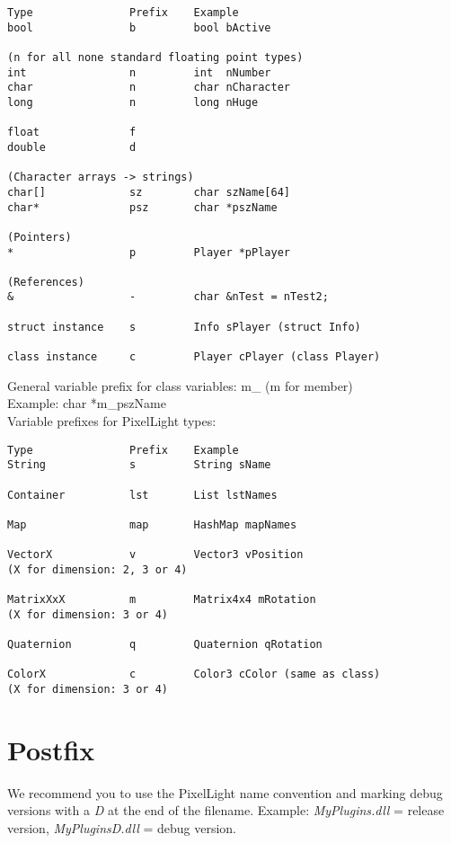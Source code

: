 \begin{lstlisting}[caption=Variable prefixes for standard types]
Type               Prefix    Example
bool               b         bool bActive

(n for all none standard floating point types)
int                n         int  nNumber
char               n         char nCharacter
long               n         long nHuge

float              f
double             d

(Character arrays -> strings)
char[]             sz        char szName[64]
char*              psz       char *pszName

(Pointers)
*                  p         Player *pPlayer

(References)
&                  -         char &nTest = nTest2;

struct instance    s         Info sPlayer (struct Info)

class instance     c         Player cPlayer (class Player)
\end{lstlisting}

General variable prefix for class variables:
m\_ (m for member)\\
Example: char *m\_pszName\\

Variable prefixes for PixelLight types:

\begin{lstlisting}[caption=Variable prefixes for PixelLight types]
Type               Prefix    Example
String             s         String sName

Container          lst       List lstNames

Map                map       HashMap mapNames

VectorX            v         Vector3 vPosition
(X for dimension: 2, 3 or 4)

MatrixXxX          m         Matrix4x4 mRotation
(X for dimension: 3 or 4)

Quaternion         q         Quaternion qRotation

ColorX             c         Color3 cColor (same as class)
(X for dimension: 3 or 4)
\end{lstlisting}




\section{Postfix}
We recommend you to use the PixelLight name convention and marking debug versions with a \emph{D} at the end of the filename. Example: \emph{MyPlugins.dll} = release version, \emph{MyPluginsD.dll} = debug version.




